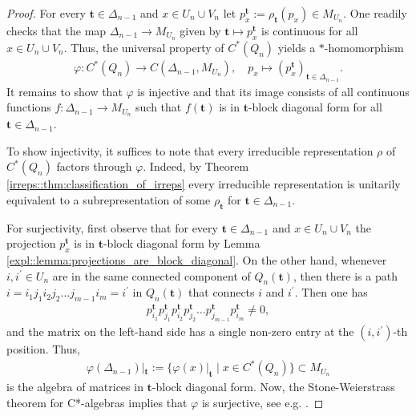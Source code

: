 \documentclass[a4paper]{amsart}
\begin{document}
\begin{proof}
    For every $\mathbf{t} \in \Delta_{n-1}$ and $x \in U_n \cup V_n$ let $p_x^{\mathbf{t}} := \rho_\mathbf{t}(p_x) \in M_{U_n}$. One readily checks that the map $\Delta_{n-1} \to M_{U_n}$ given by $\mathbf{t} \mapsto p_x^{\mathbf{t}}$ is continuous for all $x \in U_n \cup V_n$. Thus, the universal property of $C^\ast(Q_n)$ yields a $\ast$-homomorphism
    \begin{align*}
        \varphi: C^\ast(Q_n) \to C(\Delta_{n-1}, M_{U_n}), \quad
        p_x \mapsto (p_x^{\mathbf{t}})_{\mathbf{t} \in \Delta_{n-1}}.
    \end{align*}
    It remains to show that $\varphi$ is injective and that its image consists of all continuous functions $f: \Delta_{n-1} \to M_{U_n}$ such that $f(\mathbf{t})$ is in $\mathbf{t}$-block diagonal form for all $\mathbf{t} \in \Delta_{n-1}$.

    To show injectivity, it suffices to note that every irreducible representation $\rho$ of $C^\ast(Q_n)$ factors through $\varphi$. Indeed, by Theorem \ref{irreps::thm:classification_of_irreps} every irreducible representation is unitarily equivalent to a subrepresentation of some $\rho_\mathbf{t}$ for $\mathbf{t} \in \Delta_{n-1}$.

    For surjectivity, first observe that for every $\mathbf{t} \in \Delta_{n-1}$ and $x \in U_n \cup V_n$ the projection $p_x^{\mathbf{t}}$ is in $\mathbf{t}$-block diagonal form by Lemma \ref{expl::lemma:projections_are_block_diagonal}.
    On the other hand, whenever $i, i^\prime \in U_n$ are in the same connected component of $Q_n(\mathbf{t})$, then there is a path $i= i_1j_1i_2j_2 \dots j_{m-1} i_m = i^\prime$ in $Q_n(\mathbf{t})$ that connects $i$ and $i^\prime$. Then one has
    \begin{align*}
        p_{i_1}^{\mathbf{t}} p_{j_1}^{\mathbf{t}} p_{i_2}^{\mathbf{t}} p_{j_2}^{\mathbf{t}} \dots p_{j_{m-1}}^{\mathbf{t}} p_{i_m}^{\mathbf{t}} \neq 0,
    \end{align*}
    and the matrix on the left-hand side has a single non-zero entry at the $(i,i^\prime)$-th position. Thus, 
    \begin{align*}
        \varphi(\Delta_{n-1})|_\mathbf{t} := \{ \varphi(x)|_\mathbf{t} \mid x \in C^\ast(Q_n) \} \subset M_{U_n}
    \end{align*}
    is the algebra of matrices in $\mathbf{t}$-block diagonal form. Now, the Stone-Weierstrass theorem for C*-algebras implies that $\varphi$ is surjective, see e.g. \cite[Theorem 11.1.8]{dixmier_c-algebras_1977}.
\end{proof}
\end{document}
